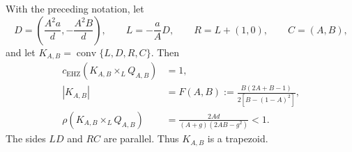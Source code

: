 


\begin{theorem}\label{thm:alternative-truncated-cover}
With the preceding notation, let
\[
 D=\left(\frac{A^2a}{d},-\frac{A^2B}{d}\right),\qquad
 L=-\frac aA D,\qquad R=L+(1,0),\qquad C=(A,B),
\]
and let $K_{A,B}=\operatorname{conv}\{L,D,R,C\}$. Then
\begin{align}
 c_{\mathrm{EHZ}}(K_{A,B}\times_L Q_{A,B})&=1,
 \label{eq:alternative-capacity}\\
 |K_{A,B}|&=F(A,B):=\frac{B(2A+B-1)}{2[B-(1-A)^2]},
 \label{eq:alternative-area}\\
 \rho(K_{A,B}\times_L Q_{A,B})
 &=\frac{2Ad}{(A+g)(2AB-g^2)}<1.
 \label{eq:alternative-sys}
\end{align}
The sides $LD$ and $RC$ are parallel. Thus $K_{A,B}$ is a trapezoid.
\end{theorem}


